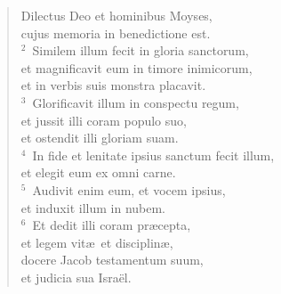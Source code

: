 \begin{flushleft}\begin{verse}\vspace{-19pt}\hspace{6pt}Dilectus Deo et hominibus Moyses,\\\hspace{6pt} cujus memoria in benedictione est.\\
${}^{2}$~Similem illum fecit in gloria sanctorum,\\ et magnificavit eum in timore inimicorum,\\ et in verbis suis monstra placavit.\\
${}^{3}$~Glorificavit illum in conspectu regum,\\ et jussit illi coram populo suo,\\ et ostendit illi gloriam suam.\\
${}^{4}$~In fide et lenitate ipsius sanctum fecit illum,\\ et elegit eum ex omni carne.\\
${}^{5}$~Audivit enim eum, et vocem ipsius,\\ et induxit illum in nubem.\\
${}^{6}$~Et dedit illi coram pr\ae cepta,\\ et legem vit\ae\ et disciplin\ae ,\\ docere Jacob testamentum suum,\\ et judicia sua Isra\"el.\end{verse}\end{flushleft}


